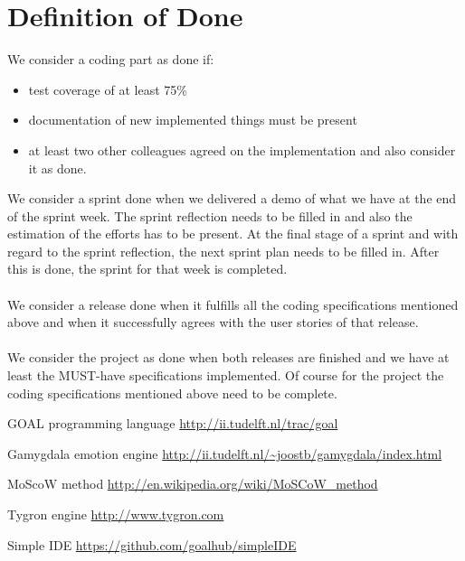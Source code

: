 \documentclass[]{article}
\begin{document}
\section{Definition of Done}
We consider a coding part as done if:
\begin{itemize}
	\item test coverage of at least 75\%
	\item documentation of new implemented things must be present
	\item at least two other colleagues agreed on the implementation and also consider it as done.
\end{itemize}
We consider a sprint done when we delivered a demo of what we have at the end of the sprint week. The sprint reflection needs to be filled in and also the estimation of the efforts has to be present. At the final stage of a sprint and with regard to the sprint reflection, the next sprint plan needs to be filled in. After this is done, the sprint for that week is completed.\\
\\
We consider a release done when it fulfills all the coding specifications mentioned above and when it successfully agrees with the user stories of that release.\\
\\
We consider the project as done when both releases are finished and we have at least the MUST-have specifications implemented. Of course for the project the coding specifications mentioned above need to be complete.
\clearpage
\printglossaries


\begin{thebibliography}{9}
	
	GOAL programming language
	\url{http://ii.tudelft.nl/trac/goal}
	
	Gamygdala emotion engine
	\url{http://ii.tudelft.nl/~joostb/gamygdala/index.html}
	
	MoScoW method
	\url{http://en.wikipedia.org/wiki/MoSCoW_method }
	
	Tygron engine
	\url{http://www.tygron.com }
	
	Simple IDE
	\url{https://github.com/goalhub/simpleIDE }
	
	
\end{thebibliography}
\end{document}
